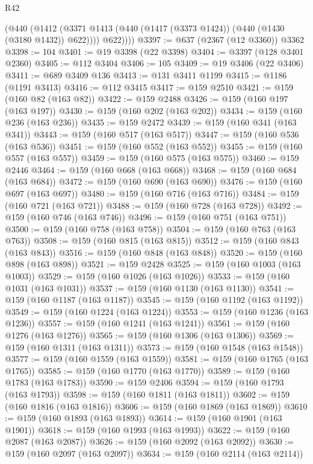 \begin{lexlean}{R42}
\begin{coremodule}
          (@440
            (@1412 (@3371 @1413 (@440 (@1417 (@3373 @1424)) (@440 (@1430 (@3180 @1432)) @622))))
            @622))))
@3397 := @637 (@2367 (@12 @3360)) @3362
@3398 := 104
@3401 := @19 @3398 (@22 @3398)
@3404 := @3397 (@128 @3401 @2360)
@3405 := @112 @3404
@3406 := 105
@3409 := @19 @3406 (@22 @3406)
@3411 := @689 @3409 @136
@3413 := @131 @3411 @1199
@3415 := @1186 (@1191 @3413)
@3416 := @112 @3415
@3417 := @159 @2510
@3421 := @159 (@160 @82 (@163 @82))
@3422 := @159 @2488
@3426 := @159 (@160 @197 (@163 @197))
@3430 := @159 (@160 @202 (@163 @202))
@3434 := @159 (@160 @236 (@163 @236))
@3435 := @159 @2472
@3439 := @159 (@160 @341 (@163 @341))
@3443 := @159 (@160 @517 (@163 @517))
@3447 := @159 (@160 @536 (@163 @536))
@3451 := @159 (@160 @552 (@163 @552))
@3455 := @159 (@160 @557 (@163 @557))
@3459 := @159 (@160 @575 (@163 @575))
@3460 := @159 @2446
@3464 := @159 (@160 @668 (@163 @668))
@3468 := @159 (@160 @684 (@163 @684))
@3472 := @159 (@160 @690 (@163 @690))
@3476 := @159 (@160 @697 (@163 @697))
@3480 := @159 (@160 @716 (@163 @716))
@3484 := @159 (@160 @721 (@163 @721))
@3488 := @159 (@160 @728 (@163 @728))
@3492 := @159 (@160 @746 (@163 @746))
@3496 := @159 (@160 @751 (@163 @751))
@3500 := @159 (@160 @758 (@163 @758))
@3504 := @159 (@160 @763 (@163 @763))
@3508 := @159 (@160 @815 (@163 @815))
@3512 := @159 (@160 @843 (@163 @843))
@3516 := @159 (@160 @848 (@163 @848))
@3520 := @159 (@160 @898 (@163 @898))
@3521 := @159 @2428
@3525 := @159 (@160 @1003 (@163 @1003))
@3529 := @159 (@160 @1026 (@163 @1026))
@3533 := @159 (@160 @1031 (@163 @1031))
@3537 := @159 (@160 @1130 (@163 @1130))
@3541 := @159 (@160 @1187 (@163 @1187))
@3545 := @159 (@160 @1192 (@163 @1192))
@3549 := @159 (@160 @1224 (@163 @1224))
@3553 := @159 (@160 @1236 (@163 @1236))
@3557 := @159 (@160 @1241 (@163 @1241))
@3561 := @159 (@160 @1276 (@163 @1276))
@3565 := @159 (@160 @1306 (@163 @1306))
@3569 := @159 (@160 @1311 (@163 @1311))
@3573 := @159 (@160 @1548 (@163 @1548))
@3577 := @159 (@160 @1559 (@163 @1559))
@3581 := @159 (@160 @1765 (@163 @1765))
@3585 := @159 (@160 @1770 (@163 @1770))
@3589 := @159 (@160 @1783 (@163 @1783))
@3590 := @159 @2406
@3594 := @159 (@160 @1793 (@163 @1793))
@3598 := @159 (@160 @1811 (@163 @1811))
@3602 := @159 (@160 @1816 (@163 @1816))
@3606 := @159 (@160 @1869 (@163 @1869))
@3610 := @159 (@160 @1893 (@163 @1893))
@3614 := @159 (@160 @1901 (@163 @1901))
@3618 := @159 (@160 @1993 (@163 @1993))
@3622 := @159 (@160 @2087 (@163 @2087))
@3626 := @159 (@160 @2092 (@163 @2092))
@3630 := @159 (@160 @2097 (@163 @2097))
@3634 := @159 (@160 @2114 (@163 @2114))

\end{coremodule}
\end{lexlean}
